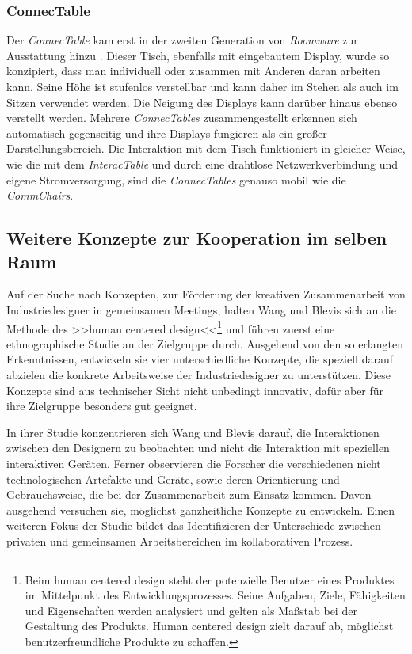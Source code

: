 \subsubsection{ConnecTable}

Der \emph{ConnecTable} kam erst in der zweiten Generation von \emph{Roomware} zur Ausstattung hinzu \citep{Streitz:2002p214}. Dieser Tisch, ebenfalls mit eingebautem Display, wurde so konzipiert, dass man individuell oder zusammen mit Anderen daran arbeiten kann. Seine Höhe ist stufenlos verstellbar und kann daher im Stehen als auch im Sitzen verwendet werden. Die Neigung des Displays kann darüber hinaus ebenso verstellt werden. Mehrere \emph{ConnecTables} zusammengestellt erkennen sich automatisch gegenseitig und ihre Displays fungieren als ein großer Darstellungsbereich. Die Interaktion mit dem Tisch funktioniert in gleicher Weise, wie die mit dem \emph{InteracTable} und durch eine drahtlose Netzwerkverbindung und eigene Stromversorgung, sind die \emph{ConnecTables} genauso mobil wie die \emph{CommChairs}.

\subsection{Weitere Konzepte zur Kooperation im selben Raum}

Auf der Suche nach Konzepten, zur Förderung der kreativen Zusammenarbeit von Industriedesigner in gemeinsamen Meetings, halten Wang und Blevis \citep{Wang:2004p110} sich an die Methode des >>human centered design<<\footnote{Beim human centered design steht der potenzielle Benutzer eines Produktes im Mittelpunkt des Entwicklungsprozesses. Seine Aufgaben, Ziele, Fähigkeiten und Eigenschaften werden analysiert und gelten als Maßstab bei der Gestaltung des Produkts. Human centered design zielt darauf ab, möglichst benutzerfreundliche Produkte zu schaffen.} und führen zuerst eine ethnographische Studie an der Zielgruppe durch. Ausgehend von den so erlangten Erkenntnissen, entwickeln sie vier unterschiedliche Konzepte, die speziell darauf abzielen die konkrete Arbeitsweise der Industriedesigner zu unterstützen. Diese Konzepte sind aus technischer Sicht nicht unbedingt innovativ, dafür aber für ihre Zielgruppe besonders gut geeignet.

In ihrer Studie konzentrieren sich Wang und Blevis \citep{Wang:2004p110} darauf, die Interaktionen zwischen den Designern zu beobachten und nicht die Interaktion mit speziellen interaktiven Geräten. Ferner observieren die Forscher die verschiedenen nicht technologischen Artefakte und Geräte, sowie deren Orientierung und Gebrauchsweise, die bei der Zusammenarbeit zum Einsatz kommen. Davon ausgehend versuchen sie, möglichst ganzheitliche Konzepte zu entwickeln. Einen weiteren Fokus der Studie bildet das Identifizieren der Unterschiede zwischen privaten und gemeinsamen Arbeitsbereichen im kollaborativen Prozess.

